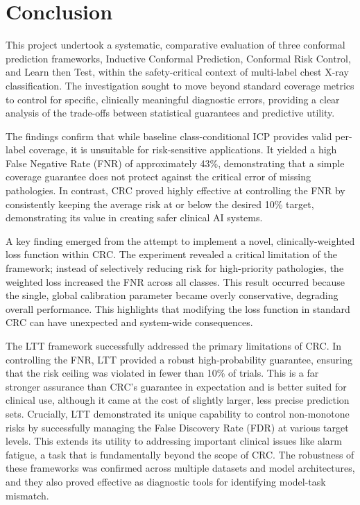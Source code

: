 \chapter{Conclusion}
\label{ch:conclusion}

This project undertook a systematic, comparative evaluation of three conformal prediction frameworks,
Inductive Conformal Prediction, Conformal Risk Control, and Learn then Test,
within the safety-critical context of multi-label chest X-ray classification.
The investigation sought to move beyond standard coverage metrics to control for specific,
clinically meaningful diagnostic errors,
providing a clear analysis of the trade-offs between statistical guarantees and predictive utility.

The findings confirm that while baseline class-conditional ICP provides valid per-label coverage,
it is unsuitable for risk-sensitive applications.
It yielded a high False Negative Rate (FNR) of approximately 43\%,
demonstrating that a simple coverage guarantee does not protect
against the critical error of missing pathologies.
In contrast, CRC proved highly effective at controlling the FNR by
consistently keeping the average risk at or below the desired 10\% target,
demonstrating its value in creating safer clinical AI systems.

A key finding emerged from the attempt to implement a novel,
clinically-weighted loss function within CRC.
The experiment revealed a critical limitation of the framework;
instead of selectively reducing risk for high-priority pathologies,
the weighted loss increased the FNR across all classes.
This result occurred because the single, global calibration parameter became overly conservative,
degrading overall performance.
This highlights that modifying the loss function in standard CRC
can have unexpected and system-wide consequences.

The LTT framework successfully addressed the primary limitations of CRC.
In controlling the FNR, LTT provided a robust high-probability guarantee,
ensuring that the risk ceiling was violated in fewer than 10\% of trials.
This is a far stronger assurance than CRC's guarantee in expectation
and is better suited for clinical use,
although it came at the cost of slightly larger, less precise prediction sets.
Crucially, LTT demonstrated its unique capability to control non-monotone risks
by successfully managing the False Discovery Rate (FDR) at various target levels.
This extends its utility to addressing important clinical issues like alarm fatigue,
a task that is fundamentally beyond the scope of CRC.
The robustness of these frameworks was confirmed across multiple datasets and model architectures,
and they also proved effective as diagnostic tools for identifying model-task mismatch.

